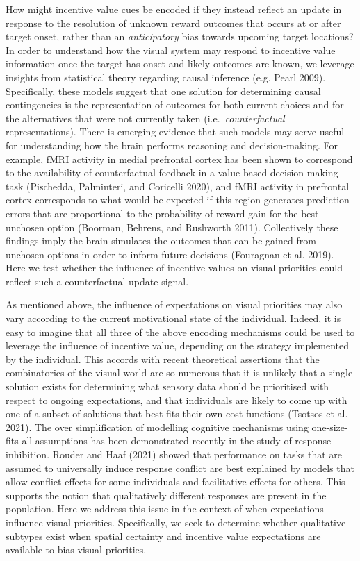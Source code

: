 \documentclass[11pt,halfline,a4paper,]{ouparticle}
\begin{document}
How might incentive value cues be encoded if they instead reflect an update in response to the resolution of unknown reward outcomes that occurs at or after target onset, rather than an \emph{anticipatory} bias towards upcoming target locations? In order to understand how the visual system may respond to incentive value information once the target has onset and likely outcomes are known, we leverage insights from statistical theory regarding causal inference (e.g. Pearl 2009). Specifically, these models suggest that one solution for determining causal contingencies is the representation of outcomes for both current choices and for the alternatives that were not currently taken (i.e.~\emph{counterfactual} representations). There is emerging evidence that such models may serve useful for understanding how the brain performs reasoning and decision-making. For example, fMRI activity in medial prefrontal cortex has been shown to correspond to the availability of counterfactual feedback in a value-based decision making task (Pischedda, Palminteri, and Coricelli 2020), and fMRI activity in prefrontal cortex corresponds to what would be expected if this region generates prediction errors that are proportional to the probability of reward gain for the best unchosen option (Boorman, Behrens, and Rushworth 2011). Collectively these findings imply the brain simulates the outcomes that can be gained from unchosen options in order to inform future decisions (Fouragnan et al. 2019). Here we test whether the influence of incentive values on visual priorities could reflect such a counterfactual update signal.

As mentioned above, the influence of expectations on visual priorities may also vary according to the current motivational state of the individual. Indeed, it is easy to imagine that all three of the above encoding mechanisms could be used to leverage the influence of incentive value, depending on the strategy implemented by the individual. This accords with recent theoretical assertions that the combinatorics of the visual world are so numerous that it is unlikely that a single solution exists for determining what sensory data should be prioritised with respect to ongoing expectations, and that individuals are likely to come up with one of a subset of solutions that best fits their own cost functions (Tsotsos et al. 2021). The over simplification of modelling cognitive mechanisms using one-size-fits-all assumptions has been demonstrated recently in the study of response inhibition. Rouder and Haaf (2021) showed that performance on tasks that are assumed to universally induce response conflict are best explained by models that allow conflict effects for some individuals and facilitative effects for others. This supports the notion that qualitatively different responses are present in the population. Here we address this issue in the context of when expectations influence visual priorities. Specifically, we seek to determine whether qualitative subtypes exist when spatial certainty and incentive value expectations are available to bias visual priorities.
\end{document}
